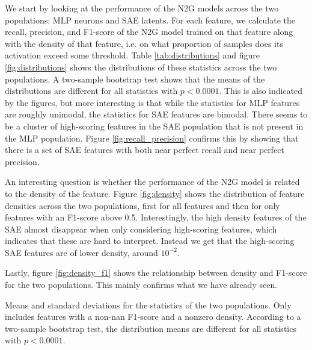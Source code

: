 We start by looking at the performance of the N2G models across the two populations: MLP neurons and SAE latents.
For each feature, we calculate the recall, precision, and F1-score of the N2G model trained on that feature along with the density of that feature, i.e. on what proportion of samples does its activation exceed some threshold.
Table \ref{tab:distributions} and figure \ref{fig:distributions} shows the distributions of these statistics across the two populations.
A two-sample bootstrap test shows that the means of the distributions are different for all statistics with $p<0.0001$.
This is also indicated by the figures, but more interesting is that while the statistics for MLP features are roughly unimodal, the statistics for SAE features are bimodal.
There seems to be a cluster of high-scoring features in the SAE population that is not present in the MLP population.
Figure \ref{fig:recall_precision} confirms this by showing that there is a set of SAE features with both near perfect recall and near perfect precision.

An interesting question is whether the performance of the N2G model is related to the density of the feature.
Figure \ref{fig:density} shows the distribution of feature densities across the two populations, first for all features and then for only features with an F1-score above 0.5.
Interestingly, the high density features of the SAE almost disappear when only considering high-scoring features, which indicates that these are hard to interpret.
Instead we get that the high-scoring SAE features are of lower density, around $10^{-2}$.

Lastly, figure \ref{fig:density_f1} shows the relationship between density and F1-score for the two populations.
This mainly confirms what we have already seen.

\begin{table}[]
    \centering
    
    \caption{Means and standard deviations for the statistics of the two populations. Only includes features with a non-nan F1-score and a nonzero density. According to a two-sample bootstrap test, the distribution means are different for all statistics with $p<0.0001$.}
    \label{tab:distributions}
    \end{table}


